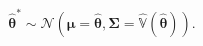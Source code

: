 \begin{equation}
	\label{eq:mc}
	\hat{\boldsymbol{\theta}}^{\ast}
	\sim
	\mathcal{N}
	\left(
	\boldsymbol{\mu} = \hat{\boldsymbol{\theta}},
	\boldsymbol{\Sigma} = \hat{\mathbb{V}} \left( \hat{\boldsymbol{\theta}} \right)
	\right) .
\end{equation}

